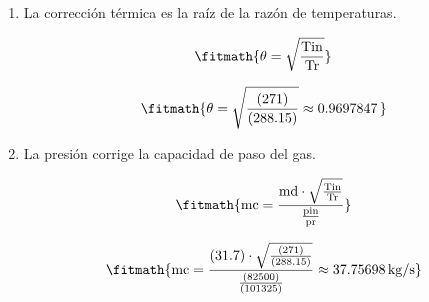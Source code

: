 \begin{enumerate}

\item La corrección térmica es la raíz de la razón de temperaturas.

\[\fitmath{\theta=\sqrt{\frac{\mathrm{Tin}}{\mathrm{Tr}}}}\]

\[\fitmath{\theta=\sqrt{\frac{(271)}{(288.15)}}\approx 0.9697847\,}\]

\item La presión corrige la capacidad de paso del gas.

\[\fitmath{\mathrm{mc}=\frac{\mathrm{md}\cdot \sqrt{\frac{\mathrm{Tin}}{\mathrm{Tr}}}}{\frac{\mathrm{pin}}{\mathrm{pr}}}}\]

\[\fitmath{\mathrm{mc}=\frac{(31.7)\cdot \sqrt{\frac{(271)}{(288.15)}}}{\frac{(82500)}{(101325)}}\approx 37.75698\,\mathrm{kg/s}}\]

\end{enumerate}
